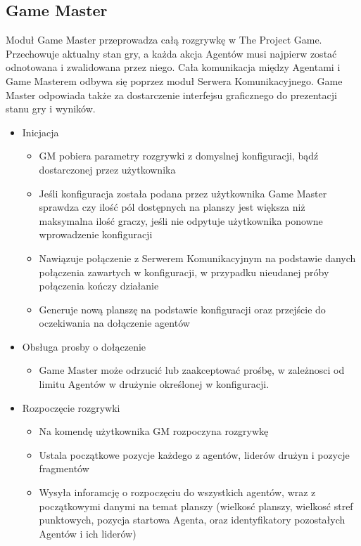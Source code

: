 \documentclass[../Dokumentacja.tex]{subfiles}
\begin{document}
\subsection{Game Master}
Moduł Game Master przeprowadza całą rozgrywkę w The Project Game. Przechowuje aktualny stan gry,
a każda akcja Agentów musi najpierw zostać odnotowana i zwalidowana przez niego.
Cała komunikacja między Agentami i Game Masterem odbywa się poprzez moduł Serwera Komunikacyjnego.
Game Master odpowiada także za dostarczenie interfejsu graficznego do prezentacji stanu gry i wyników.


\begin{itemize}
	\item Inicjacja
	\begin{itemize}
		\item GM pobiera parametry rozgrywki z domyslnej konfiguracji, bądź dostarczonej przez użytkownika
		\item Jeśli konfiguracja została podana przez użytkownika Game Master sprawdza czy ilość pól dostępnych na planszy jest większa niż maksymalna ilość graczy, jeśli nie odpytuje użytkownika ponowne wprowadzenie konfiguracji
		\item Nawiązuje połączenie z Serwerem Komunikacyjnym na podstawie danych połączenia zawartych w konfiguracji, w przypadku nieudanej próby połączenia kończy działanie
		\item Generuje nową planszę na podstawie konfiguracji oraz przejście do oczekiwania na dołączenie agentów
	\end{itemize}
	\item Obsługa prosby o dołączenie
	\begin{itemize}
		\item Game Master może odrzucić lub zaakceptować prośbę, w zależnosci od limitu Agentów w drużynie określonej w konfiguracji.
	\end{itemize}
		\item Rozpoczęcie rozgrywki
	\begin{itemize}
		\item Na komendę użytkownika GM rozpoczyna rozgrywkę
		\item Ustala początkowe pozycje każdego z agentów, liderów drużyn i pozycje fragmentów
		\item Wysyła inforamcję o rozpoczęciu do wszystkich agentów, wraz z początkowymi danymi na temat planszy (wielkosć planszy, wielkosć stref punktowych, pozycja startowa Agenta, oraz identyfikatory pozostałych Agentów i ich liderów)

\end{itemize}
\end{itemize}
\end{document}
